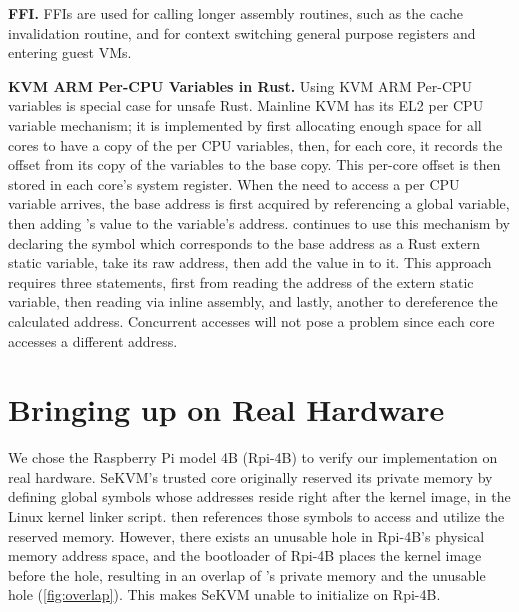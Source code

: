 \textbf{FFI.}
FFIs are used for calling longer assembly routines, such as the cache
invalidation routine, and  for context switching general
purpose registers and entering guest VMs.

\textbf{KVM ARM Per-CPU Variables in Rust.}
Using KVM ARM Per-CPU variables is special case for unsafe Rust.
Mainline KVM has its EL2 per CPU variable mechanism; it is implemented by first
allocating enough space for all cores to have a copy of the per CPU variables,
then, for each core, it records the offset from its copy of the variables to the
base copy. This per-core offset is then stored in each core's 
system register. When the need to access a per CPU variable arrives, the
base address is first acquired by referencing a global variable, then adding
's value to the variable's address. \rustsec{} continues to use
this mechanism by declaring the symbol which corresponds to the base address as
a Rust extern static variable, take its raw address, then add the value in
 to it. This approach requires three  statements,
first from reading the address of the extern static variable, then reading
 via inline assembly, and lastly, another  to
dereference the calculated address. Concurrent accesses will not pose a problem
since each core accesses a different address.

\section{Bringing up \rustsec{} on Real Hardware}

We chose the Raspberry Pi model 4B (Rpi-4B) to verify our implementation on
real hardware.
SeKVM's trusted core \secore{} originally reserved its private memory by
defining global symbols whose addresses reside right after the kernel image,
in the Linux kernel linker script.
\secore{} then references those symbols to access and utilize the reserved
memory.
However, there exists an unusable hole in Rpi-4B's physical memory address
space, and the bootloader of Rpi-4B places the kernel image before the hole,
resulting in an overlap of \secore{}'s private memory and the unusable hole
(\autoref{fig:overlap}). This makes SeKVM unable to initialize on Rpi-4B.

